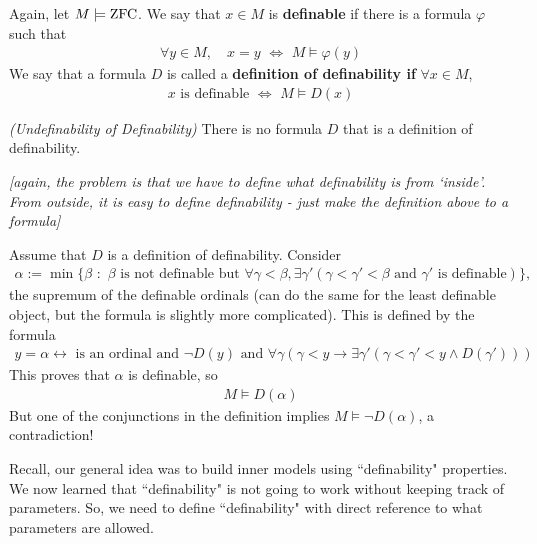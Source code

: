 \documentclass[12pt,a4paper]{article}
\newenvironment{proof}
{\begin{changemargin}{0.5cm}{0.5cm} 
	}%
	{\end{changemargin}
}
\newenvironment{p}
{\begin{proof} 
	}%
	{\end{proof}
}
\begin{document}
 Again, let $M\models \text{ZFC}$. We say that $x\in M$ is \textbf{definable} if there is a formula $\varphi$ such that 
\begin{align*}
\forall y\in M, \quad x=y \,\, \Leftrightarrow \,\, M\models \varphi(y)
\end{align*}
We say that a formula $D$ is called a \textbf{definition of definability if} $\forall x\in M$,
\begin{align*}
x \text{ is definable} \,\, \Leftrightarrow \,\, M \models D(x)
\end{align*}
\s

\thm \emph{(Undefinability of Definability)} There is no formula $D$ that is a definition of definability.

\quad \emph{[again, the problem is that we have to define what definability is from `inside'. From outside, it is easy to define definability - just make the definition above to a formula]}
\begin{p}
\pf Assume that $D$ is a definition of definability. Consider
\begin{align*}
\alpha := \min \{ \beta\,\, : \,\, \beta \text{ is not definable but } \forall \gamma < \beta, \exists \gamma'(\gamma < \gamma'< \beta \text{ and } \gamma' \text{ is definable}) \},
\end{align*}
the supremum of the definable ordinals (can do the same for the least definable object, but the formula is slightly more complicated). This is defined by the formula
\begin{align*}
y=\alpha \leftrightarrow  \text{ is an ordinal and } \neg D(y) \text{ and } \forall \gamma (\gamma < y \rightarrow \exists \gamma' (\gamma < \gamma' < y \wedge D(\gamma'))) 
\end{align*}
This proves that $\alpha$ is definable, so
\begin{align*}
M \models D(\alpha)
\end{align*}
But one of the conjunctions in the definition implies $M\models \neg D(\alpha)$, a contradiction!

\eop
\end{p}
\s

Recall, our general idea was to build inner models using ``definability" properties. We now learned that ``definability" is not going to work without keeping track of parameters. So, we need to define ``definability" with direct reference to what parameters are allowed.
\s
\end{document}
